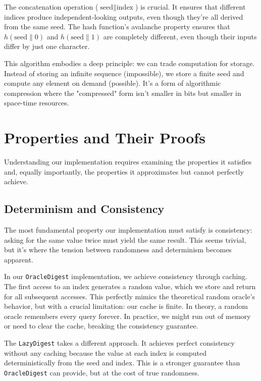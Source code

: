 \documentclass[11pt]{article}
\begin{document}
The concatenation operation ($\text{seed} \| \text{index}$) is crucial. It ensures that different indices produce independent-looking outputs, even though they're all derived from the same seed. The hash function's avalanche property ensures that $h(\text{seed} \| 0)$ and $h(\text{seed} \| 1)$ are completely different, even though their inputs differ by just one character.

This algorithm embodies a deep principle: we can trade computation for storage. Instead of storing an infinite sequence (impossible), we store a finite seed and compute any element on demand (possible). It's a form of algorithmic compression where the "compressed" form isn't smaller in bits but smaller in space-time resources.

\section{Properties and Their Proofs}

Understanding our implementation requires examining the properties it satisfies and, equally importantly, the properties it approximates but cannot perfectly achieve.

\subsection{Determinism and Consistency}

The most fundamental property our implementation must satisfy is consistency: asking for the same value twice must yield the same result. This seems trivial, but it's where the tension between randomness and determinism becomes apparent.

In our \texttt{OracleDigest} implementation, we achieve consistency through caching. The first access to an index generates a random value, which we store and return for all subsequent accesses. This perfectly mimics the theoretical random oracle's behavior, but with a crucial limitation: our cache is finite. In theory, a random oracle remembers every query forever. In practice, we might run out of memory or need to clear the cache, breaking the consistency guarantee.

The \texttt{LazyDigest} takes a different approach. It achieves perfect consistency without any caching because the value at each index is computed deterministically from the seed and index. This is a stronger guarantee than \texttt{OracleDigest} can provide, but at the cost of true randomness.
\end{document}

